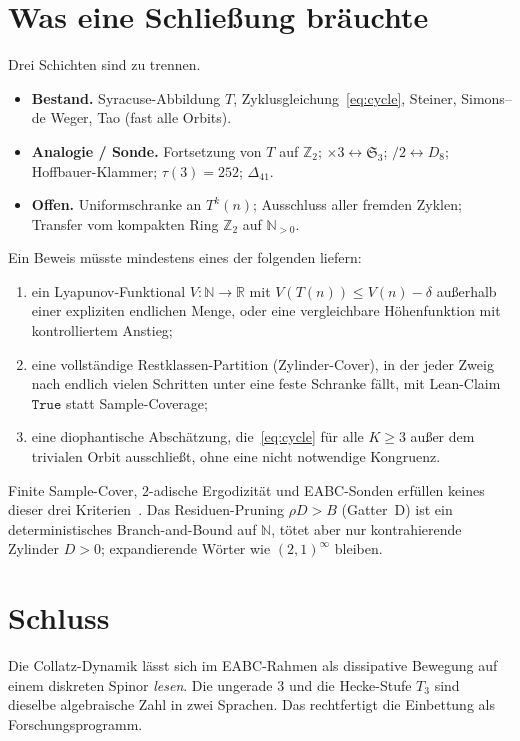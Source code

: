\documentclass[11pt,a4paper]{article}
\theoremstyle{definition}
\theoremstyle{remark}
\numberwithin{equation}{section}
\begin{document}
\section{Was eine Schließung br\"auchte}

Drei Schichten sind zu trennen.
\begin{itemize}
\item \textbf{Bestand.}
Syracuse-Abbildung \(T\), Zyklusgleichung~\eqref{eq:cycle},
Steiner, Simons--de Weger, Tao (fast alle Orbits).
\item \textbf{Analogie / Sonde.}
Fortsetzung von \(T\) auf \(\mathbb{Z}_2\);
\(\times 3\leftrightarrow\mathfrak{S}_3\); \(/2\leftrightarrow D_8\);
Hoffbauer-Klammer; \(\tau(3)=252\); \(\Delta_{41}\).
\item \textbf{Offen.}
Uniformschranke an \(T^k(n)\);
Ausschluss aller fremden Zyklen;
Transfer vom kompakten Ring \(\mathbb{Z}_2\) auf \(\mathbb{N}_{>0}\).
\end{itemize}

\vspace{0.6em}
Ein Beweis m\"usste mindestens eines der folgenden liefern:
\begin{enumerate}
\item ein Lyapunov-Funktional \(V:\mathbb{N}\to\mathbb{R}\) mit \(V(T(n))\le V(n)-\delta\)
außerhalb einer expliziten endlichen Menge, oder eine vergleichbare H\"ohenfunktion
mit kontrolliertem Anstieg;
\item eine vollst\"andige Restklassen-Partition (Zylinder-Cover), in der jeder Zweig
nach endlich vielen Schritten unter eine feste Schranke f\"allt, mit Lean-Claim
\(\mathtt{True}\) statt Sample-Coverage;
\item eine diophantische Absch\"atzung, die~\eqref{eq:cycle} f\"ur alle \(K\ge 3\)
außer dem trivialen Orbit ausschließt, ohne eine nicht notwendige Kongruenz.
\end{enumerate}
Finite Sample-Cover, \(2\)-adische Ergodizit\"at und EABC-Sonden erf\"ullen keines
dieser drei Kriterien~\cite{CollatzFast2026}.
Das Residuen-Pruning \(\rho D>B\) (Gatter~D) ist ein deterministisches Branch-and-Bound auf \(\mathbb{N}\),
t\"otet aber nur kontrahierende Zylinder \(D>0\); expandierende W\"orter wie \((2,1)^{\infty}\) bleiben.

\section{Schluss}

Die Collatz-Dynamik l\"asst sich im EABC-Rahmen als dissipative Bewegung auf einem
diskreten Spinor \emph{lesen}.
Die ungerade \(3\) und die Hecke-Stufe \(T_3\) sind dieselbe algebraische Zahl in
zwei Sprachen.
Das rechtfertigt die Einbettung als Forschungsprogramm.
\end{document}
